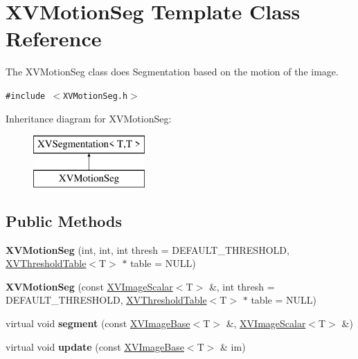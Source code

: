 \hypertarget{class_XVMotionSeg}{
\section{XVMotion\-Seg  Template Class Reference}
\label{XVMotionSeg}
}
The XVMotion\-Seg class does Segmentation based on the motion of the image. 


{\tt \#include $<$XVMotion\-Seg.h$>$}

Inheritance diagram for XVMotion\-Seg:\begin{figure}[H]
\begin{center}
\leavevmode
\includegraphics[height=2cm]{class_XVMotionSeg}
\end{center}
\end{figure}
\subsection*{Public Methods}
\begin{CompactItemize}
\item 
\label{XVMotionSeg_a0}
\hypertarget{class_XVMotionSeg_a0}{
{\bf XVMotion\-Seg} (int, int, int thresh = DEFAULT\_\-THRESHOLD, \hyperlink{class_XVThresholdTable}{XVThreshold\-Table}$<$T$>$ $\ast$ table = NULL)}

\item 
\label{XVMotionSeg_a1}
\hypertarget{class_XVMotionSeg_a1}{
{\bf XVMotion\-Seg} (const \hyperlink{class_XVImageScalar}{XVImage\-Scalar}$<$T$>$ \&, int thresh = DEFAULT\_\-THRESHOLD, \hyperlink{class_XVThresholdTable}{XVThreshold\-Table}$<$T$>$ $\ast$ table = NULL)}

\item 
\label{XVMotionSeg_a2}
\hypertarget{class_XVMotionSeg_a2}{
virtual void {\bf segment} (const \hyperlink{class_XVImageBase}{XVImage\-Base}$<$T$>$ \&, \hyperlink{class_XVImageScalar}{XVImage\-Scalar}$<$T$>$ \&)}

\item 
virtual void {\bf update} (const \hyperlink{class_XVImageBase}{XVImage\-Base}$<$T$>$ \& im)
\end{CompactItemize}
